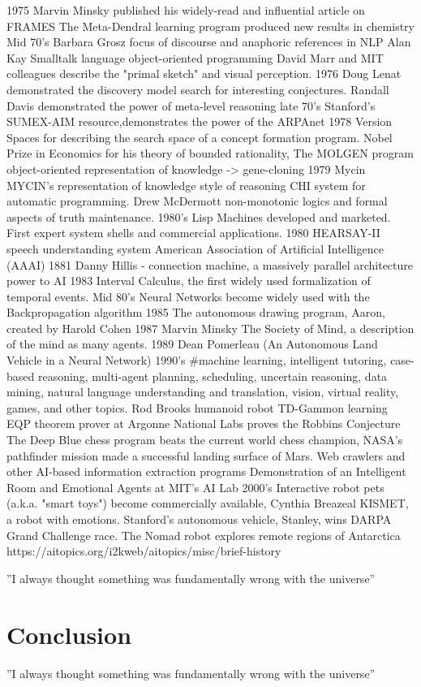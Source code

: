 \documentclass[12pt, letterpaper]{article}
\begin{document}
1975
Marvin Minsky published his widely-read and influential article on FRAMES
The Meta-Dendral learning program produced new results in chemistry
Mid 70's
Barbara Grosz focus of discourse and anaphoric references in NLP
Alan Kay  Smalltalk language object-oriented programming
David Marr and MIT colleagues describe the "primal sketch" and visual perception.
1976
Doug Lenat demonstrated the discovery model search for interesting conjectures.
Randall Davis demonstrated the power of meta-level reasoning
late 70's
Stanford's SUMEX-AIM resource,demonstrates the power of the ARPAnet
1978
Version Spaces for describing the search space of a concept formation program.
Nobel Prize in Economics for his theory of bounded rationality,
The MOLGEN program  object-oriented representation of knowledge -> gene-cloning
1979
Mycin MYCIN's representation of knowledge style of reasoning
CHI system for automatic programming.
Drew McDermott non-monotonic logics and formal aspects of truth maintenance.
1980's
Lisp Machines developed and marketed.
First expert system shells and commercial applications.
1980
HEARSAY-II speech understanding system
American Association of Artificial Intelligence (AAAI) 
1881
Danny Hillis - connection machine, a massively parallel architecture power to AI
1983
Interval Calculus, the first widely used formalization of temporal events.
Mid 80's
Neural Networks become widely used with the Backpropagation algorithm
1985
The autonomous drawing program, Aaron, created by Harold Cohen
1987
Marvin Minsky The Society of Mind, a description of the mind as many agents.
1989
Dean Pomerleau (An Autonomous Land Vehicle in a Neural Network)
1990's
#machine learning, intelligent tutoring, case-based reasoning, multi-agent planning, scheduling, uncertain reasoning, data mining, natural language understanding and translation, vision, virtual reality, games, and other topics.
Rod Brooks humanoid robot
TD-Gammon learning
EQP theorem prover at Argonne National Labs proves the Robbins Conjecture
The Deep Blue chess program beats the current world chess champion, 
NASA’s pathfinder mission made a successful landing surface of Mars. 
Web crawlers and other AI-based information extraction programs
Demonstration of an Intelligent Room and Emotional Agents at MIT's AI Lab
2000's
Interactive robot pets (a.k.a. "smart toys") become commercially available,
Cynthia Breazeal KISMET, a robot with emotions.
Stanford's autonomous vehicle, Stanley, wins DARPA Grand Challenge race.
The Nomad robot explores remote regions of Antarctica 
https://aitopics.org/i2kweb/aitopics/misc/brief-history

''I always thought something was fundamentally wrong with the universe'' \citep{Kimbark197109}
\section{Conclusion}
''I always thought something was fundamentally wrong with the universe'' \citep{adams1995hitchhiker}



\end{document}
